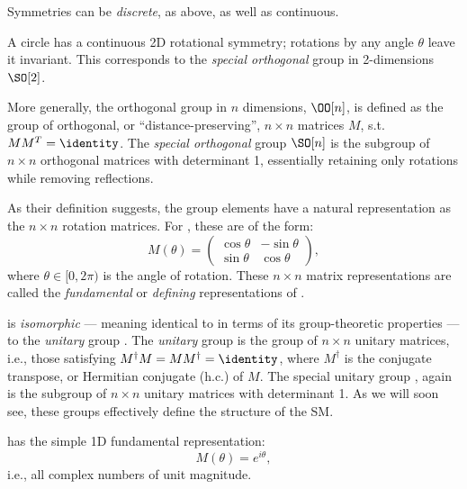 Symmetries can be \textit{discrete}, as above, as well as continuous.

\begin{example}
\label{example:01_circle}
A circle has a continuous 2D rotational symmetry; rotations by any angle $\theta$ leave it invariant.
This corresponds to the \textit{special orthogonal} group in 2-dimensions $\SO[2]$.
\end{example}

\begin{definition}
\label{def:01_son}
More generally, the orthogonal group in $n$ dimensions, $\OO[n]$, is defined as	the group of orthogonal, or ``distance-preserving'', $n \times n$ matrices $M$, s.t. $MM^T = \identity$. 
The \textit{special orthogonal} group $\SO[n]$ is the subgroup of $n \times n$ orthogonal matrices with determinant 1, essentially retaining only rotations while removing reflections.
\end{definition}

As their definition suggests, the \SO[n] group elements have a natural representation as the $n \times n$ rotation matrices.
For \SO[2], these are of the form:
\begin{equation}
	\label{eq:01_so2}
	M(\theta) = \begin{pmatrix}
		\cos \theta & -\sin \theta \\
		\sin \theta & \cos \theta
	\end{pmatrix},
\end{equation}
where $\theta \in [0, 2\pi)$ is the angle of rotation.
These $n \times n$ matrix representations are called the \textit{fundamental} or \textit{defining} representations of \SO[n].

\begin{definition}
\label{def:01_sun}
\SO[2] is \textit{isomorphic} --- meaning identical to in terms of its group-theoretic properties --- to the \textit{unitary} group \UU[1].
The \textit{unitary} group \UU[n] is the group of $n \times n$ unitary matrices, i.e., those satisfying $M^\dagger M = MM^\dagger = \identity$, where $M^\dagger$ is the conjugate transpose, or Hermitian conjugate (h.c.) of $M$.
The special unitary group \SU[n], again is the subgroup of $n \times n$ unitary matrices with determinant 1.
As we will soon see, these groups effectively define the structure of the SM.
\end{definition}

\UU[1] has the simple 1D fundamental representation:
\begin{equation}
	\label{eq:01_u1}
	M(\theta) = e^{i\theta},
\end{equation}
i.e., all complex numbers of unit magnitude.


